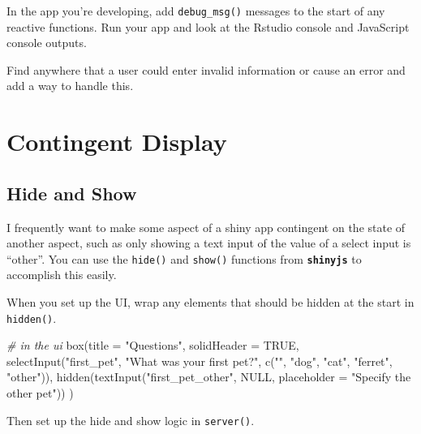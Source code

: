 \documentclass[
  oneside]{book}
\newenvironment{Shaded}{\begin{snugshade}}{\end{snugshade}}
\newcommand{\AttributeTok}[1]{\textcolor[rgb]{0.77,0.63,0.00}{#1}}
\newcommand{\CommentTok}[1]{\textcolor[rgb]{0.56,0.35,0.01}{\textit{#1}}}
\newcommand{\ConstantTok}[1]{\textcolor[rgb]{0.00,0.00,0.00}{#1}}
\newcommand{\ControlFlowTok}[1]{\textcolor[rgb]{0.13,0.29,0.53}{\textbf{#1}}}
\newcommand{\FunctionTok}[1]{\textcolor[rgb]{0.00,0.00,0.00}{#1}}
\newcommand{\NormalTok}[1]{#1}
\newcommand{\SpecialCharTok}[1]{\textcolor[rgb]{0.00,0.00,0.00}{#1}}
\newcommand{\StringTok}[1]{\textcolor[rgb]{0.31,0.60,0.02}{#1}}
\begin{document}
In the app you're developing, add \texttt{debug\_msg}\texttt{()} messages to the start of any reactive functions. Run your app and look at the Rstudio console and JavaScript console outputs.

Find anywhere that a user could enter invalid information or cause an error and add a way to handle this.

\hypertarget{contingency}{%
\chapter{Contingent Display}\label{contingency}}

\hypertarget{hide-and-show}{%
\section{Hide and Show}\label{hide-and-show}}

I frequently want to make some aspect of a shiny app contingent on the state of another aspect, such as only showing a text input of the value of a select input is ``other''. You can use the \texttt{hide}\texttt{()} and \texttt{show}\texttt{()} functions from \textbf{\texttt{shinyjs}} to accomplish this easily.

When you set up the UI, wrap any elements that should be hidden at the start in \texttt{hidden}\texttt{()}.

\begin{Shaded}
\begin{Highlighting}[]
\CommentTok{\# in the ui}
\FunctionTok{box}\NormalTok{(}\AttributeTok{title =} \StringTok{"Questions"}\NormalTok{,}
    \AttributeTok{solidHeader =} \ConstantTok{TRUE}\NormalTok{,}
    \FunctionTok{selectInput}\NormalTok{(}\StringTok{"first\_pet"}\NormalTok{, }\StringTok{"What was your first pet?"}\NormalTok{, }
                \FunctionTok{c}\NormalTok{(}\StringTok{""}\NormalTok{, }\StringTok{"dog"}\NormalTok{, }\StringTok{"cat"}\NormalTok{, }\StringTok{"ferret"}\NormalTok{, }\StringTok{"other"}\NormalTok{)),}
    \FunctionTok{hidden}\NormalTok{(}\FunctionTok{textInput}\NormalTok{(}\StringTok{"first\_pet\_other"}\NormalTok{, }\ConstantTok{NULL}\NormalTok{, }
                     \AttributeTok{placeholder =} \StringTok{"Specify the other pet"}\NormalTok{))}
\NormalTok{)}
\end{Highlighting}
\end{Shaded}

Then set up the hide and show logic in \texttt{server}\texttt{()}.

\begin{Shaded}
\end{Shaded}
\end{document}
